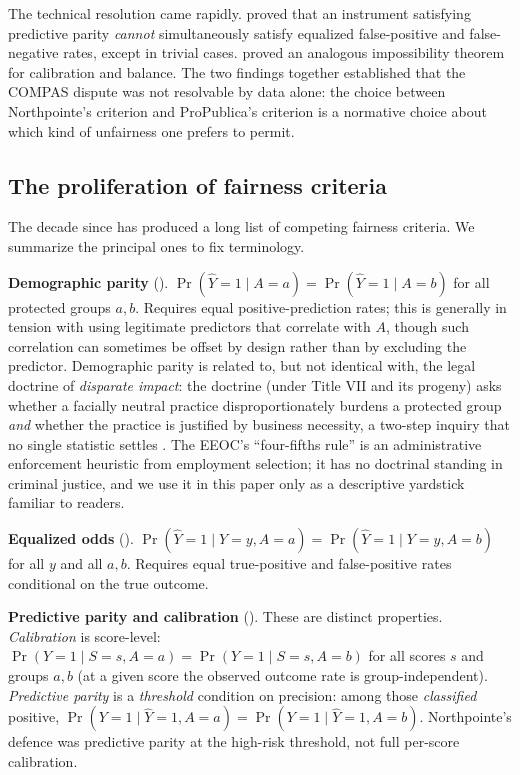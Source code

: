 \documentclass[11pt]{article}
\begin{document}
The technical resolution came rapidly.
\citet{chouldechova2017} proved that an instrument satisfying
predictive parity \emph{cannot} simultaneously satisfy equalized
false-positive and false-negative rates, except in trivial cases.
\citet{kleinberg2017} proved an analogous impossibility theorem for
calibration and balance. The two findings together established that
the COMPAS dispute was not resolvable by data alone: the choice
between Northpointe's criterion and ProPublica's criterion is a
normative choice about which kind of unfairness one prefers to permit.

\subsection{The proliferation of fairness criteria}

The decade since has produced a long list of competing fairness
criteria. We summarize the principal ones to fix terminology.

\textbf{Demographic parity} (\citealp{feldman2015}).
$\Pr(\hat{Y} = 1 \mid A = a) = \Pr(\hat{Y} = 1 \mid A = b)$ for all
protected groups $a, b$. Requires equal positive-prediction rates; this
is generally in tension with using legitimate predictors that correlate
with $A$, though such correlation can sometimes be offset by design
rather than by excluding the predictor. Demographic parity is related
to, but not identical with, the legal doctrine of \emph{disparate
impact}: the doctrine (under Title VII and its progeny) asks whether a
facially neutral practice disproportionately burdens a protected group
\emph{and} whether the practice is justified by business necessity,
a two-step inquiry that no single statistic settles
\citep{barocas2016}. The EEOC's ``four-fifths rule'' is an
administrative enforcement heuristic from employment selection; it has
no doctrinal standing in criminal justice, and we use it in this paper
only as a descriptive yardstick familiar to readers.

\textbf{Equalized odds} (\citealp{hardt2016}).
$\Pr(\hat{Y} = 1 \mid Y = y, A = a) = \Pr(\hat{Y} = 1 \mid Y = y, A
= b)$ for all $y$ and all $a, b$. Requires equal true-positive and
false-positive rates conditional on the true outcome.

\textbf{Predictive parity and calibration} (\citealp{chouldechova2017}).
These are distinct properties. \emph{Calibration} is score-level:
$\Pr(Y = 1 \mid S = s, A = a) = \Pr(Y = 1 \mid S = s, A = b)$ for all
scores $s$ and groups $a, b$ (at a given score the observed outcome rate
is group-independent). \emph{Predictive parity} is a \emph{threshold}
condition on precision: among those \emph{classified} positive,
$\Pr(Y = 1 \mid \hat{Y} = 1, A = a) = \Pr(Y = 1 \mid \hat{Y} = 1, A = b)$.
Northpointe's defence was predictive parity at the high-risk threshold,
not full per-score calibration.
\end{document}
